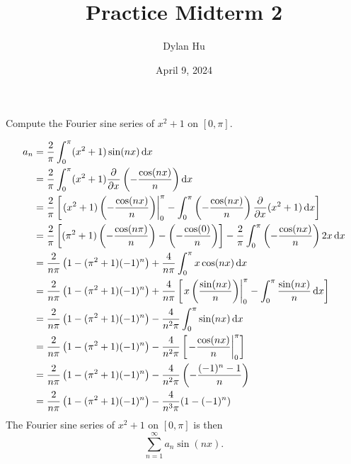 \documentclass[plain]{pset}
\title{Practice Midterm 2}
\author{Dylan Hu}
\date{April 9, 2024}
\begin{document}
\maketitle

\pagebreak

\begin{problem}
Compute the Fourier sine series of \(x^2 + 1\) on \([0, \pi]\).
\end{problem}

\begin{solution}
    \begin{align*}
        a_n & = \frac{2}{\pi} \int_0^\pi (x^2 + 1) \sin(nx) \mathop{}\!\mathrm{d} x                                                                                                                              \\
            & = \frac{2}{\pi} \int_0^\pi (x^2 + 1) \frac{\partial^{} }{\partial x^{}} \left(-\frac{\cos(nx)}{n}\right) \mathop{}\!\mathrm{d} x                                                                                            \\
            & = \frac{2}{\pi} \left[\left. (x^2 + 1) \left(-\frac{\cos(nx)}{n}\right) \right|_0^\pi - \int_0^\pi \left(-\frac{\cos(nx)}{n}\right) \frac{\partial^{} }{\partial x^{}} (x^2 + 1) \mathop{}\!\mathrm{d} x\right]             \\
            & = \frac{2}{\pi} \left[(\pi^2 + 1)\left(-\frac{\cos(n\pi)}{n}\right) - \left(-\frac{\cos(0)}{n}\right)\right] - \frac{2}{\pi}\int_0^\pi \left(-\frac{\cos(nx)}{n}\right) 2x \mathop{}\!\mathrm{d} x \\
            & = \frac{2}{n\pi}\left(1-(\pi^2 + 1)(-1)^n\right) + \frac{4}{n\pi} \int_0^\pi x\cos(nx) \mathop{}\!\mathrm{d} x                                                                                     \\
            & = \frac{2}{n\pi}\left(1-(\pi^2 + 1)(-1)^n\right) + \frac{4}{n\pi} \left[\left. x \left(\frac{\sin(nx)}{n}\right)\right|_0^\pi - \int_0^\pi \frac{\sin(nx)}{n} \mathop{}\!\mathrm{d} x\right]       \\
            & = \frac{2}{n\pi}\left(1-(\pi^2 + 1)(-1)^n\right) - \frac{4}{n^2\pi} \int_0^\pi \sin(nx) \mathop{}\!\mathrm{d} x                                                                                    \\
            & = \frac{2}{n\pi}\left(1-(\pi^2 + 1)(-1)^n\right) - \frac{4}{n^2\pi} \left[\left. -\frac{\cos(nx)}{n}\right|_0^\pi\right]                                                         \\
            & = \frac{2}{n\pi}\left(1-(\pi^2 + 1)(-1)^n\right) - \frac{4}{n^2\pi} \left(-\frac{(-1)^n - 1}{n}\right)                                                                           \\
            & = \frac{2}{n\pi}\left(1-(\pi^2 + 1)(-1)^n\right) - \frac{4}{n^3\pi}(1 - (-1)^n)                                                                                                  \\
    \end{align*}
    The Fourier sine series of \(x^2 + 1\) on \([0, \pi]\) is then
    \[\sum_{n=1}^\infty a_n \sin(nx).\]


\end{solution}
\end{document}
